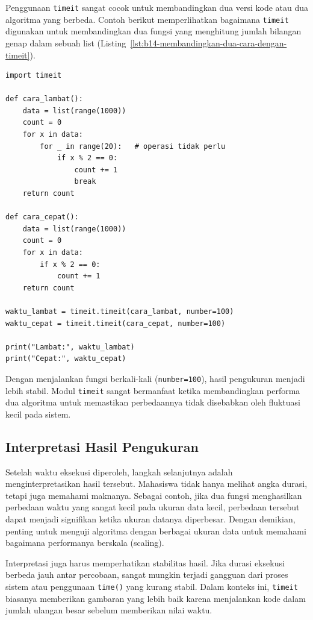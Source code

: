 Penggunaan \texttt{timeit} sangat cocok untuk membandingkan dua versi kode atau dua algoritma yang berbeda. Contoh berikut memperlihatkan bagaimana \texttt{timeit} digunakan untuk membandingkan dua fungsi yang menghitung jumlah bilangan genap dalam sebuah list (Listing~\ref{lst:b14-membandingkan-dua-cara-dengan-timeit}).

\begin{lstlisting}[style=PythonStyle, caption={Membandingkan dua cara dengan timeit}, label={lst:b14-membandingkan-dua-cara-dengan-timeit}]
import timeit

def cara_lambat():
    data = list(range(1000))
    count = 0
    for x in data:
        for _ in range(20):   # operasi tidak perlu
            if x % 2 == 0:
                count += 1
                break
    return count

def cara_cepat():
    data = list(range(1000))
    count = 0
    for x in data:
        if x % 2 == 0:
            count += 1
    return count

waktu_lambat = timeit.timeit(cara_lambat, number=100)
waktu_cepat = timeit.timeit(cara_cepat, number=100)

print("Lambat:", waktu_lambat)
print("Cepat:", waktu_cepat)
\end{lstlisting}

Dengan menjalankan fungsi berkali-kali (\texttt{number=100}), hasil pengukuran menjadi lebih stabil. Modul \texttt{timeit} sangat bermanfaat ketika membandingkan performa dua algoritma untuk memastikan perbedaannya tidak disebabkan oleh fluktuasi kecil pada sistem.

\subsection{Interpretasi Hasil Pengukuran}

Setelah waktu eksekusi diperoleh, langkah selanjutnya adalah menginterpretasikan hasil tersebut. Mahasiswa tidak hanya melihat angka durasi, tetapi juga memahami maknanya. Sebagai contoh, jika dua fungsi menghasilkan perbedaan waktu yang sangat kecil pada ukuran data kecil, perbedaan tersebut dapat menjadi signifikan ketika ukuran datanya diperbesar. Dengan demikian, penting untuk menguji algoritma dengan berbagai ukuran data untuk memahami bagaimana performanya berskala (scaling).

Interpretasi juga harus memperhatikan stabilitas hasil. Jika durasi eksekusi berbeda jauh antar percobaan, sangat mungkin terjadi gangguan dari proses sistem atau penggunaan \texttt{time()} yang kurang stabil. Dalam konteks ini, \texttt{timeit} biasanya memberikan gambaran yang lebih baik karena menjalankan kode dalam jumlah ulangan besar sebelum memberikan nilai waktu.

